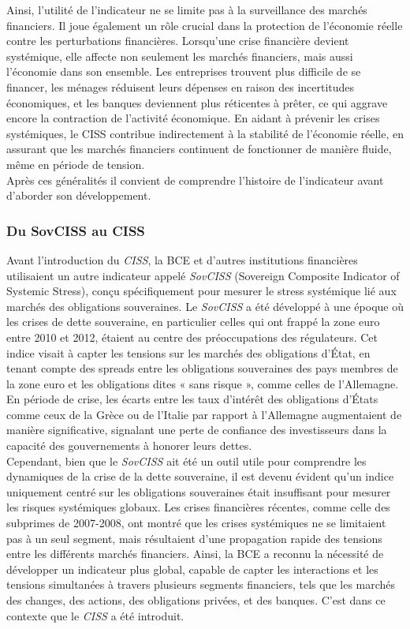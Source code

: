 Ainsi, l'utilité de l'indicateur ne se limite pas à la surveillance des marchés financiers. Il joue également un rôle crucial dans la protection de l'économie réelle contre les perturbations financières. Lorsqu'une crise financière devient systémique, elle affecte non seulement les marchés financiers, mais aussi l'économie dans son ensemble. Les entreprises trouvent plus difficile de se financer, les ménages réduisent leurs dépenses en raison des incertitudes économiques, et les banques deviennent plus réticentes à prêter, ce qui aggrave encore la contraction de l'activité économique. En aidant à prévenir les crises systémiques, le CISS contribue indirectement à la stabilité de l'économie réelle, en assurant que les marchés financiers continuent de fonctionner de manière fluide, même en période de tension.\\ 

Après ces généralités il convient de comprendre l'histoire de l'indicateur avant d'aborder son développement.

\subsubsection{Du SovCISS au CISS}

Avant l'introduction du \textit{CISS}, la BCE et d'autres institutions financières utilisaient un autre indicateur appelé \textit{SovCISS} (Sovereign Composite Indicator of Systemic Stress), conçu spécifiquement pour mesurer le stress systémique lié aux marchés des obligations souveraines. Le \textit{SovCISS} a été développé à une époque où les crises de dette souveraine, en particulier celles qui ont frappé la zone euro entre 2010 et 2012, étaient au centre des préoccupations des régulateurs. Cet indice visait à capter les tensions sur les marchés des obligations d'État, en tenant compte des spreads entre les obligations souveraines des pays membres de la zone euro et les obligations dites « sans risque », comme celles de l'Allemagne. En période de crise, les écarts entre les taux d’intérêt des obligations d’États comme ceux de la Grèce ou de l’Italie par rapport à l’Allemagne augmentaient de manière significative, signalant une perte de confiance des investisseurs dans la capacité des gouvernements à honorer leurs dettes.\\

Cependant, bien que le \textit{SovCISS} ait été un outil utile pour comprendre les dynamiques de la crise de la dette souveraine, il est devenu évident qu'un indice uniquement centré sur les obligations souveraines était insuffisant pour mesurer les risques systémiques globaux. Les crises financières récentes, comme celle des subprimes de 2007-2008, ont montré que les crises systémiques ne se limitaient pas à un seul segment, mais résultaient d'une propagation rapide des tensions entre les différents marchés financiers. Ainsi, la BCE a reconnu la nécessité de développer un indicateur plus global, capable de capter les interactions et les tensions simultanées à travers plusieurs segments financiers, tels que les marchés des changes, des actions, des obligations privées, et des banques. C’est dans ce contexte que le \textit{CISS} a été introduit.\\

